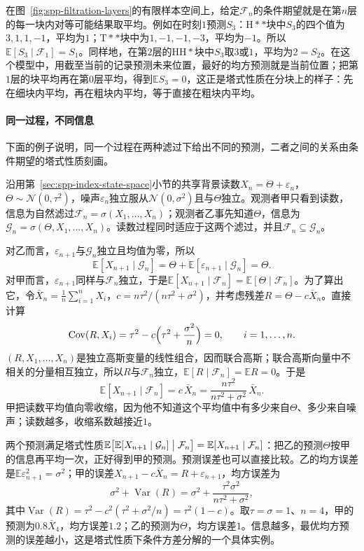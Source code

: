 \begin{example}[按块平均的预测]
\label{ex:spp-block-average}
在图~\ref{fig:spp-filtration-layers}的有限样本空间上，给定$\mathcal F_n$的条件期望就是在第$n$层的每一块内对等可能结果取平均。例如在时刻$1$预测$S_3$：$\mathrm H**$块中$S_3$的四个值为$3,1,1,-1$，平均为$1$；$\mathrm T**$块中为$1,-1,-1,-3$，平均为$-1$。所以$\mathbb E[S_3\mid\mathcal F_1]=S_1$。同样地，在第$2$层的$\mathrm{HH}*$块中$S_3$取$3$或$1$，平均为$2=S_2$。在这个模型中，用截至当前的记录预测未来位置，最好的均方预测就是当前位置；把第$1$层的块平均再在第$0$层平均，得到$\mathbb ES_3=0$，这正是塔式性质在分块上的样子：先在细块内平均，再在粗块内平均，等于直接在粗块内平均。
\end{example}

\paragraph{同一过程，不同信息}
下面的例子说明，同一个过程在两种滤过下给出不同的预测，二者之间的关系由条件期望的塔式性质刻画。

\begin{example}[共享背景下的两个观测者]
\label{ex:spp-two-observers}
沿用第~\ref{sec:spp-index-state-space}小节的共享背景读数$X_n=\Theta+\varepsilon_n$，$\Theta\sim\mathcal N(0,\tau^2)$，噪声$\varepsilon_n$独立服从$\mathcal N(0,\sigma^2)$且与$\Theta$独立。观测者甲只看到读数，信息为自然滤过$\mathcal F_n=\sigma(X_1,\ldots,X_n)$；观测者乙事先知道$\Theta$，信息为$\mathcal G_n=\sigma(\Theta,X_1,\ldots,X_n)$。读数过程同时适应于这两个滤过，并且$\mathcal F_n\subseteq\mathcal G_n$。

对乙而言，$\varepsilon_{n+1}$与$\mathcal G_n$独立且均值为零，所以
\[
  \mathbb E[X_{n+1}\mid\mathcal G_n]=\Theta+\mathbb E[\varepsilon_{n+1}\mid\mathcal G_n]=\Theta .
\]
对甲而言，$\varepsilon_{n+1}$同样与$\mathcal F_n$独立，于是$\mathbb E[X_{n+1}\mid\mathcal F_n]=\mathbb E[\Theta\mid\mathcal F_n]$。为了算出它，令$\bar X_n=\frac1n\sum_{i=1}^nX_i$，$c=n\tau^2/(n\tau^2+\sigma^2)$，并考虑残差$R=\Theta-c\bar X_n$。直接计算
\[
  \operatorname{Cov}(R,X_i)=\tau^2-c\Bigl(\tau^2+\frac{\sigma^2}{n}\Bigr)=0,\qquad i=1,\ldots,n .
\]
$(R,X_1,\ldots,X_n)$是独立高斯变量的线性组合，因而联合高斯；联合高斯向量中不相关的分量相互独立，所以$R$与$\mathcal F_n$独立，$\mathbb E[R\mid\mathcal F_n]=\mathbb ER=0$。于是
\[
  \mathbb E[X_{n+1}\mid\mathcal F_n]=c\,\bar X_n=\frac{n\tau^2}{n\tau^2+\sigma^2}\,\bar X_n .
\]
甲把读数平均值向零收缩，因为他不知道这个平均值中有多少来自$\Theta$、多少来自噪声；读数越多，收缩系数越接近$1$。

两个预测满足塔式性质$\mathbb E\bigl[\mathbb E[X_{n+1}\mid\mathcal G_n]\bigm|\mathcal F_n\bigr]=\mathbb E[X_{n+1}\mid\mathcal F_n]$：把乙的预测$\Theta$按甲的信息再平均一次，正好得到甲的预测。预测误差也可以直接比较。乙的均方误差是$\mathbb E\varepsilon_{n+1}^2=\sigma^2$；甲的误差$X_{n+1}-c\bar X_n=R+\varepsilon_{n+1}$，均方误差为
\[
  \sigma^2+\operatorname{Var}(R)=\sigma^2+\frac{\tau^2\sigma^2}{n\tau^2+\sigma^2},
\]
其中$\operatorname{Var}(R)=\tau^2-c^2(\tau^2+\sigma^2/n)=\tau^2(1-c)$。取$\tau=\sigma=1$、$n=4$，甲的预测为$0.8\bar X_4$，均方误差$1.2$；乙的预测为$\Theta$，均方误差$1$。信息越多，最优均方预测的误差越小，这是塔式性质下条件方差分解的一个具体实例。
\end{example}

